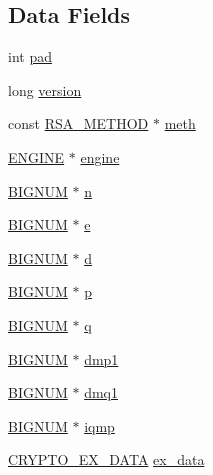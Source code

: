 \subsection*{Data Fields}
\begin{DoxyCompactItemize}
\item 
int \hyperlink{structrsa__st_af1d40a330bc745f51d8b079c9dc473ff}{pad}
\item 
long \hyperlink{structrsa__st_a17afc5cf84cee4b2123665f28ce85c9f}{version}
\item 
const \hyperlink{crypto_2ossl__typ_8h_a559f3eec8932822f887b632e86991995}{R\+S\+A\+\_\+\+M\+E\+T\+H\+OD} $\ast$ \hyperlink{structrsa__st_a0ca399c95ccef91cb794b24b867d09a5}{meth}
\item 
\hyperlink{crypto_2ossl__typ_8h_abac45b251498719318e60ab8d6192510}{E\+N\+G\+I\+NE} $\ast$ \hyperlink{structrsa__st_ae4bca26806adfdaf8a28463c98ddf03a}{engine}
\item 
\hyperlink{crypto_2ossl__typ_8h_a6fb19728907ec6515e4bfb716bffa141}{B\+I\+G\+N\+UM} $\ast$ \hyperlink{structrsa__st_ab3b67230e6d25749ea84508e84e3c708}{n}
\item 
\hyperlink{crypto_2ossl__typ_8h_a6fb19728907ec6515e4bfb716bffa141}{B\+I\+G\+N\+UM} $\ast$ \hyperlink{structrsa__st_a32feda51fa6cc1ffd56732674205b279}{e}
\item 
\hyperlink{crypto_2ossl__typ_8h_a6fb19728907ec6515e4bfb716bffa141}{B\+I\+G\+N\+UM} $\ast$ \hyperlink{structrsa__st_ac1b88e7c7683553594a92766f78462ef}{d}
\item 
\hyperlink{crypto_2ossl__typ_8h_a6fb19728907ec6515e4bfb716bffa141}{B\+I\+G\+N\+UM} $\ast$ \hyperlink{structrsa__st_ab39230b0a53cb4326ae76467247959c3}{p}
\item 
\hyperlink{crypto_2ossl__typ_8h_a6fb19728907ec6515e4bfb716bffa141}{B\+I\+G\+N\+UM} $\ast$ \hyperlink{structrsa__st_aa8aedc93a12df9d36c9fe616c2b6486a}{q}
\item 
\hyperlink{crypto_2ossl__typ_8h_a6fb19728907ec6515e4bfb716bffa141}{B\+I\+G\+N\+UM} $\ast$ \hyperlink{structrsa__st_af0afe0a0929dbc04a09db5f23880d908}{dmp1}
\item 
\hyperlink{crypto_2ossl__typ_8h_a6fb19728907ec6515e4bfb716bffa141}{B\+I\+G\+N\+UM} $\ast$ \hyperlink{structrsa__st_a346288c4353d26f1e972761f1859b1f9}{dmq1}
\item 
\hyperlink{crypto_2ossl__typ_8h_a6fb19728907ec6515e4bfb716bffa141}{B\+I\+G\+N\+UM} $\ast$ \hyperlink{structrsa__st_a105805877380f26c779af6dc8f08da7f}{iqmp}
\item 
\hyperlink{crypto_2ossl__typ_8h_a7eaff1c18057495d8af18f22d1370b51}{C\+R\+Y\+P\+T\+O\+\_\+\+E\+X\+\_\+\+D\+A\+TA} \hyperlink{structrsa__st_ac3e4fd59d6ee44a81f3a58114613c1e2}{ex\+\_\+data}

\end{DoxyCompactItemize}
